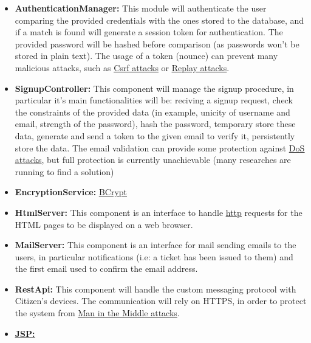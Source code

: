 \documentclass{article}
\newcommand{\link}[2]{{\color{blue}\underline{\href{#1}{#2}}}}
\begin{document}
	\begin{itemize}
		\item \label{component:AuthenticationManager} \textbf{AuthenticationManager:}
			This module will authenticate the user comparing the provided credentials with the ones stored to the database, and if a match is found
			will generate a session token for authentication. The provided password will be hashed before comparison (as passwords won't be stored
			in plain text). The usage of a token (nounce) can prevent many malicious attacks, such as 
		 	\link{https://en.wikipedia.org/wiki/Cross-site_request_forgery}{Csrf attacks} or 
			\link{https://en.wikipedia.org/wiki/Replay_attack}{Replay attacks}. 
		 \item \label{component:SignupController} \textbf{SignupController:} 
		 	This component will manage the signup procedure, in particular it's main functionalities will be: reciving a signup request, check the
		 	constraints of the provided data (in example, unicity of username and email, strength of the password), hash the password, temporary store these data, 
		 	generate and send a token to the given email to verify it, persistently store the data. The email validation can provide some protection against
		 	\link{https://en.wikipedia.org/wiki/Denial-of-service_attack}{DoS attacks}, but full protection is
		 	currently unachievable (many researches are running to find a solution)
		 \item \label{component:EncryptionService} \textbf{EncryptionService:}
		 	\link{https://en.wikipedia.org/wiki/Bcrypt}{BCrypt}
		 \item \label{component:HtmlServer} \textbf{HtmlServer:}
		 	This component is an interface to handle \link{https://en.wikipedia.org/wiki/Hypertext_Transfer_Protocol}{http} requests for the HTML pages to be displayed
		 	on a web browser. 
		 \item \label{component:MailServer} \textbf{MailServer:} 
		 	This component is an interface for mail sending emails to the users, in particular notifications (i.e: a ticket has been issued to them) and the first email
		 	used to confirm the email address.
		 \item \label{component:RestApi} \textbf{RestApi:} 
		 	This component will handle the custom messaging protocol with Citizen's devices. The communication will rely on HTTPS, in order to protect the system from 
		 	\link{https://en.wikipedia.org/wiki/Man-in-the-middle_attack}{Man in the Middle attacks}.
		 \item \label{component:JSP} \textbf{\link{https://en.wikipedia.org/wiki/JavaServer_Pages}{JSP:}}

\end{itemize}
\end{document}
